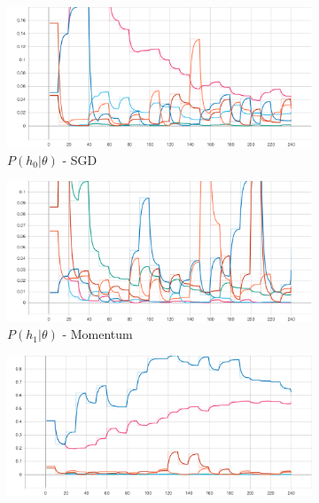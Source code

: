 \begin{figure}[htbp]
    \begin{subfigure}{0.5\textwidth}
        \centering
        \includegraphics[width=\textwidth]{analysis/bhh_case_study/iris/p_H[0].png}
        \caption{$P\left(h_{0} | \theta \right)$ - \Acs{SGD}}
        \label{fig:results:case_study:iris:p_H:0}
    \end{subfigure}
    \begin{subfigure}{0.5\textwidth}
        \centering
        \includegraphics[width=\textwidth]{analysis/bhh_case_study/iris/p_H[1].png}
        \caption{$P\left(h_{1} | \theta \right)$ - \Acs{Momentum}}
        \label{fig:results:case_study:iris:p_H:1}
    \end{subfigure}
    \par\medskip
	\begin{subfigure}{0.5\textwidth}
		\centering
		\includegraphics[width=\textwidth]{analysis/bhh_case_study/iris/p_H[2].png}

\end{subfigure}
\end{figure}
